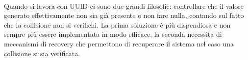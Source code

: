 \documentclass{article}
\begin{document}
\paragraph{} Quando si lavora con UUID ci sono due grandi filosofie: controllare che il valore generato effettivamente non sia già presente o non fare nulla, contando sul fatto che la collisione non si verifichi. La prima soluzione è più dispendiosa e non sempre più essere implementata in modo efficace, la seconda necessita di meccanismi di recovery che permettono di recuperare il sistema nel caso una collisione si sia verificata. 





\end{document}
